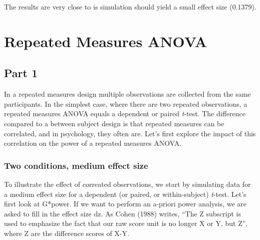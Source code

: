 \documentclass[]{book}
\begin{document}
The results are very close to is simulation should yield a small effect size (0.1379).

\hypertarget{repeated-measures-anova}{%
\chapter{Repeated Measures ANOVA}\label{repeated-measures-anova}}

\hypertarget{part-1-1}{%
\section{Part 1}\label{part-1-1}}

In a repeated measures design multiple observations are collected from the same participants. In the simplest case, where there are two repeated observations, a repeated measures ANOVA equals a dependent or paired \emph{t}-test. The difference compared to a between subject design is that repeated measures can be correlated, and in psychology, they often are. Let's first explore the impact of this correlation on the power of a repeated measures ANOVA.

\hypertarget{two-conditions-medium-effect-size}{%
\subsection{Two conditions, medium effect size}\label{two-conditions-medium-effect-size}}

To illustrate the effect of correated observations, we start by simulating data for a medium effect size for a dependent (or paired, or within-subject) \emph{t}-test. Let's first look at G*power. If we want to perform an a-priori power analysis, we are asked to fill in the effect size dz. As Cohen (1988) writes, ``The Z subscript is used to emphasize the fact that our raw score unit is no longer X or Y, but Z'', where Z are the difference scores of X-Y.
\end{document}
